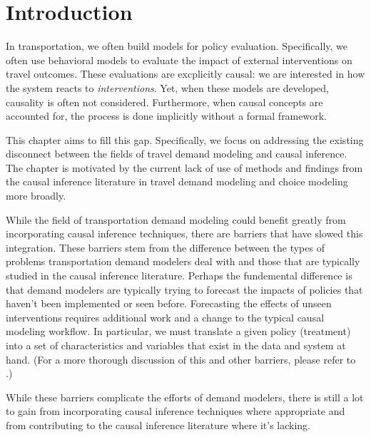 \section{Introduction}
\label{sec:intro}

In transportation, we often build models for policy evaluation.
Specifically, we often use behavioral models to evaluate the impact of external interventions on travel outcomes. 
These evaluations are excplicitly causal: we are interested in how the 
system reacts to \textit{interventions}. 
Yet, when these models are 
developed, causality is often not considered. Furthermore, when 
causal concepts are accounted for, the process is done implicitly without a 
formal framework. 

This chapter aims to fill this gap. 
Specifically, we focus on addressing the existing disconnect between the fields of travel demand modeling and causal inference. 
The chapter is motivated by the current lack of use of methods and findings from 
the causal inference literature in travel demand modeling and choice modeling more broadly. 

While the field of transportation demand modeling could benefit greatly from 
incorporating causal inference techniques, there are barriers that have slowed this integration. 
These barriers stem from the difference between the types of problems transportation demand modelers deal with and those that are typically studied in the causal inference literature. 
Perhaps the fundemental difference is that demand modelers are typically trying to forecast the impacts of policies that haven't been implemented or seen before.
Forecasting the effects of unseen interventions requires additional work and a change to the typical causal modeling workflow.
In particular, we must translate a given policy (treatment) into a set of characteristics and variables that exist in the data and system at hand.
(For a more thorough discussion of this and other barriers, please refer to \citet{brathwaite_2018_causal}.) 

While these barriers complicate the efforts of demand modelers, there is still a lot to gain from
incorporating causal inference techniques where appropriate and from contributing
to the causal inference literature where it's lacking.

